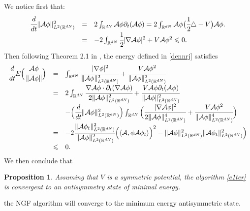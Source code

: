 \documentclass[11pt]{elsarticle}
\newtheorem{prop}{Proposition}[section]
\let \leq \leqslant
\newcommand{\R} {\ensuremath{\mathbb{R}}}
\begin{document}
We notice first that:
\begin{eqnarray*}
\left.
\begin{array}{lcl}
\cfrac{d}{dt}\|\mathcal{A}\phi\|_{L^2(\R^{dN})}^2 & = & 2\int_{\R^{dN}}\mathcal{A}\phi\partial_t(\mathcal{A}\phi) = 2\int_{\R^{dN}}\mathcal{A}\phi \big(\cfrac{1}{2}\triangle -V \big)\mathcal{A}\phi. \\
& =&  -2\int_{\R^{dN}}\cfrac{1}{2}|\nabla \mathcal{A}\phi|^2+V\mathcal{A}\phi^2 \leq 0.
\end{array}
\right.
\end{eqnarray*}
Then following Theorem 2.1 in \cite{bao}, the energy defined in \eqref{dennrj} satisfies
\begin{eqnarray*}
\left.
\begin{array}{lcl}
\cfrac{d}{dt}E\Big(\cfrac{\mathcal{A}\phi}{\|\mathcal{A}\phi\|}\Big) & = & \int_{\R^{dN}}\cfrac{|\nabla \phi|^2}{\|\mathcal{A}\phi\|^2_{L^2(\R^{dN})}} + \cfrac{V \mathcal{A}\phi^2}{\|\mathcal{A}\phi\|^2_{L^2(\R^{dN})}} \\
& = & 2 \int_{\R^{dN}}\cfrac{\nabla \mathcal{A}\phi \cdot \partial_t(\nabla \mathcal{A}\phi)}{2\|\mathcal{A}\phi\|^2_{L^2(\R^{dN})}} +\cfrac{V\mathcal{A}\phi\partial_t(\mathcal{A}\phi)}{\|\mathcal{A}\phi\|^2_{L^2(\R^{dN})}} \\
& & -\Big(\cfrac{d}{dt}\|\mathcal{A}\phi\|^2_{L^2(\R^{dN})}\Big)\int_{\R^{dN}}\Big(\cfrac{|\nabla \mathcal{A}\phi|^2}{2\|\mathcal{A}\phi\|^4_{L^2(\R^{dN})}} + \cfrac{V\mathcal{A}\phi^2}{\|\mathcal{A}\phi\|^4_{L^2(\R^{dN})}}\Big)\\
& = & -2\cfrac{\|\mathcal{A}\phi_t\|^2_{L^2(\R^{dN})}}{\|\mathcal{A}\phi\|^2_{L^2(\R^{dN})}}\Big(\langle \mathcal{A},\phi \mathcal{A}\phi_t\rangle\Big)^2-\|\mathcal{A}\phi\|^2_{L^2(\R^{dN})}\|\mathcal{A}\phi_t\|^2_{L^2(\R^{dN})}\Big)\\
& \leq & 0.
\end{array}
\right.
\end{eqnarray*}
We then conclude that
\begin{prop}
Assuming that $V$ is a symmetric potential, the algorithm \eqref{e1ter} is convergent to an antisymmetry state of minimal energy.
\end{prop}
 the NGF algorithm will converge to the minimum energy antisymmetric state. 
\end{document}
